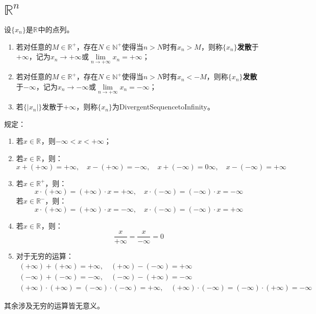 \section{$\mathbb{R}^n$}
\begin{definition}
	设$\{x_n\}$是$\mathbb{R}^{}$中的点列。
	\begin{enumerate}
		\item 若对任意的$M\in\mathbb{R}^{+}$，存在$N\in\mathbb{N}^+$使得当$n>N$时有$x_n>M$，则称$\{x_n\}$\textbf{发散}于$+\infty$，记为$x_n\to+\infty$或$\lim\limits_{n\to+\infty}x_n=+\infty$；
		\item 若对任意的$M\in\mathbb{R}^{+}$，存在$N\in\mathbb{N}^+$使得当$n>N$时有$x_n<-M$，则称$\{x_n\}$\textbf{发散}于$-\infty$，记为$x_n\to-\infty$或$\lim\limits_{n\to+\infty}x_n=-\infty$；
		\item 若$\{|x_n|\}$发散于$+\infty$，则称$\{x_n\}$为\gls{DivergentSequencetoInfinity}。 
	\end{enumerate}
\end{definition}
\begin{definition}
	规定：
	\begin{enumerate}
		\item 若$x\in\mathbb{R}^{}$，则$-\infty<x<+\infty$；
		\item 若$x\in\mathbb{R}^{}$，则：
		\begin{equation*}
			x+(+\infty)=+\infty,\quad x-(+\infty)=-\infty,\quad x+(-\infty)=0\infty,\quad x-(-\infty)=+\infty
		\end{equation*}
		\item 若$x\in\mathbb{R}^{+}$，则：
		\begin{equation*}
			x\cdot(+\infty)=(+\infty)\cdot x=+\infty,\quad x\cdot(-\infty)=(-\infty)\cdot x=-\infty
		\end{equation*}
		若$x\in\mathbb{R}^{-}$，则：
		\begin{equation*}
			x\cdot(+\infty)=(+\infty)\cdot x=-\infty,\quad x\cdot(-\infty)=(-\infty)\cdot x=+\infty
		\end{equation*}
		\item 若$x\in\mathbb{R}^{}$，则：
		\begin{equation*}
			\frac{x}{+\infty}=\frac{x}{-\infty}=0
		\end{equation*}
		\item 对于无穷的运算：
		\begin{gather*}
			(+\infty)+(+\infty)=+\infty,\quad(+\infty)-(-\infty)=+\infty \\
			(-\infty)+(-\infty)=-\infty,\quad(-\infty)-(+\infty)=-\infty \\
			(+\infty)\cdot(+\infty)=(-\infty)\cdot(-\infty)=+\infty,\quad(+\infty)\cdot(-\infty)=(-\infty)\cdot(+\infty)=-\infty
		\end{gather*}
	\end{enumerate}
	其余涉及无穷的运算皆无意义。
\end{definition}
